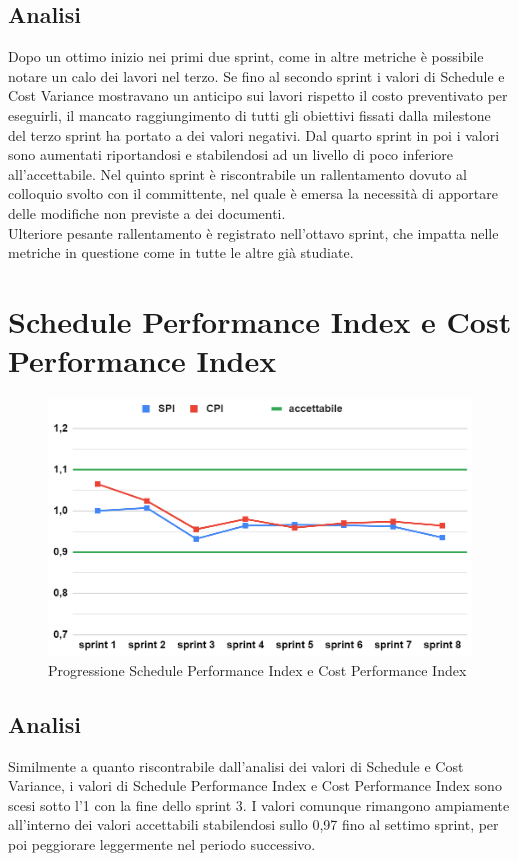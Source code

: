 \subsection{Analisi}
Dopo un ottimo inizio nei primi due sprint, come in altre metriche è possibile notare un calo dei lavori nel terzo. Se fino al secondo sprint i valori di Schedule e Cost Variance mostravano un anticipo sui lavori rispetto il costo preventivato per eseguirli, il mancato raggiungimento di tutti gli obiettivi fissati dalla milestone del terzo sprint ha portato a dei valori negativi. Dal quarto sprint in poi i valori sono aumentati riportandosi e stabilendosi ad un livello di poco inferiore all'accettabile. Nel quinto sprint è riscontrabile un rallentamento dovuto al colloquio svolto con il committente, nel quale è emersa la necessità di apportare delle modifiche non previste a dei documenti.\\
Ulteriore pesante rallentamento è registrato nell'ottavo sprint, che impatta nelle metriche in questione come in tutte le altre già studiate.

\section{Schedule Performance Index e Cost Performance Index}
\begin{figure}[H]
    \centering
    \includegraphics[width=0.8\linewidth]{SPICPI.png}
    \caption{Progressione Schedule Performance Index e Cost Performance Index}
\end{figure}
\subsection{Analisi}
Similmente a quanto riscontrabile dall'analisi dei valori di Schedule e Cost Variance, i valori di Schedule Performance Index e Cost Performance Index sono scesi sotto l'1 con la fine dello sprint 3. I valori comunque rimangono ampiamente all'interno dei valori accettabili stabilendosi sullo 0,97 fino al settimo sprint, per poi peggiorare leggermente nel periodo successivo.

